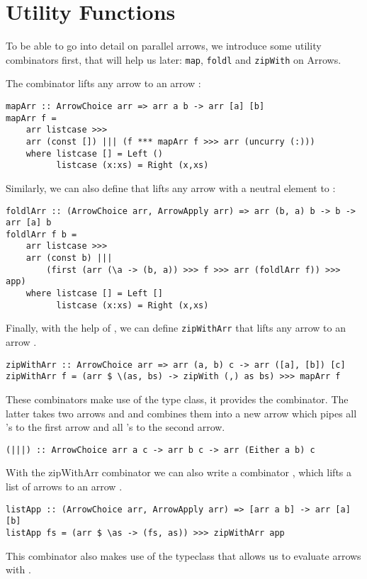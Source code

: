 \section{Utility Functions}\label{utilfns}
To be able to go into detail on parallel arrows, we introduce some utility combinators first, that will help us later: \lstinline{map}, \lstinline{foldl} and \lstinline{zipWith} on Arrows.

The  combinator lifts any arrow  to an arrow  \cite{programming_with_arrows}:
\begin{lstlisting}[frame=htrbl]
mapArr :: ArrowChoice arr => arr a b -> arr [a] [b]
mapArr f =
	arr listcase >>>
	arr (const []) ||| (f *** mapArr f >>> arr (uncurry (:)))
	where listcase [] = Left ()
	      listcase (x:xs) = Right (x,xs)
\end{lstlisting}
Similarly, we can also define  that lifts any arrow  with a neutral element  to :
\begin{lstlisting}[frame=htrbl]
foldlArr :: (ArrowChoice arr, ArrowApply arr) => arr (b, a) b -> b -> arr [a] b
foldlArr f b =
	arr listcase >>>
	arr (const b) |||
		(first (arr (\a -> (b, a)) >>> f >>> arr (foldlArr f)) >>> app)
	where listcase [] = Left []
	      listcase (x:xs) = Right (x,xs)
\end{lstlisting}
Finally, with the help of , we can define \lstinline{zipWithArr} that lifts any arrow  to an arrow .
\begin{lstlisting}[frame=htrbl]
zipWithArr :: ArrowChoice arr => arr (a, b) c -> arr ([a], [b]) [c]
zipWithArr f = (arr $ \(as, bs) -> zipWith (,) as bs) >>> mapArr f
\end{lstlisting} %
These combinators make use of the  type class, it provides the \code{|||} combinator. The latter takes two arrows  and  and combines them into a new arrow  which pipes all 's to the first arrow and all 's to the second arrow.
\begin{lstlisting}[frame=htrbl]
(|||) :: ArrowChoice arr a c -> arr b c -> arr (Either a b) c
\end{lstlisting}
With the zipWithArr combinator we can also write a combinator , which lifts a list of arrows \code{[arr a b]} to an arrow .
\begin{lstlisting}[frame=htrbl]
listApp :: (ArrowChoice arr, ArrowApply arr) => [arr a b] -> arr [a] [b]
listApp fs = (arr $ \as -> (fs, as)) >>> zipWithArr app
\end{lstlisting}%
This combinator also makes use of the  typeclass that allows us to evaluate arrows with .

